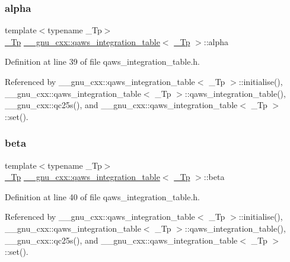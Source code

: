 \subsubsection{\texorpdfstring{alpha}{alpha}}
{\footnotesize\ttfamily template$<$typename \+\_\+\+Tp$>$ \\
\hyperlink{namespace____gnu__cxx_a3b19a9c800ca194374ef9172290f7d79}{\+\_\+\+Tp} \hyperlink{struct____gnu__cxx_1_1qaws__integration__table}{\+\_\+\+\_\+gnu\+\_\+cxx\+::qaws\+\_\+integration\+\_\+table}$<$ \hyperlink{namespace____gnu__cxx_a3b19a9c800ca194374ef9172290f7d79}{\+\_\+\+Tp} $>$\+::alpha}



Definition at line 39 of file qaws\+\_\+integration\+\_\+table.\+h.



Referenced by \+\_\+\+\_\+gnu\+\_\+cxx\+::qaws\+\_\+integration\+\_\+table$<$ \+\_\+\+Tp $>$\+::initialise(), \+\_\+\+\_\+gnu\+\_\+cxx\+::qaws\+\_\+integration\+\_\+table$<$ \+\_\+\+Tp $>$\+::qaws\+\_\+integration\+\_\+table(), \+\_\+\+\_\+gnu\+\_\+cxx\+::qc25s(), and \+\_\+\+\_\+gnu\+\_\+cxx\+::qaws\+\_\+integration\+\_\+table$<$ \+\_\+\+Tp $>$\+::set().

\mbox{\label{struct____gnu__cxx_1_1qaws__integration__table_ad7cdd51af800d8830907d0718035753c}} 
\subsubsection{\texorpdfstring{beta}{beta}}
{\footnotesize\ttfamily template$<$typename \+\_\+\+Tp$>$ \\
\hyperlink{namespace____gnu__cxx_a3b19a9c800ca194374ef9172290f7d79}{\+\_\+\+Tp} \hyperlink{struct____gnu__cxx_1_1qaws__integration__table}{\+\_\+\+\_\+gnu\+\_\+cxx\+::qaws\+\_\+integration\+\_\+table}$<$ \hyperlink{namespace____gnu__cxx_a3b19a9c800ca194374ef9172290f7d79}{\+\_\+\+Tp} $>$\+::beta}



Definition at line 40 of file qaws\+\_\+integration\+\_\+table.\+h.



Referenced by \+\_\+\+\_\+gnu\+\_\+cxx\+::qaws\+\_\+integration\+\_\+table$<$ \+\_\+\+Tp $>$\+::initialise(), \+\_\+\+\_\+gnu\+\_\+cxx\+::qaws\+\_\+integration\+\_\+table$<$ \+\_\+\+Tp $>$\+::qaws\+\_\+integration\+\_\+table(), \+\_\+\+\_\+gnu\+\_\+cxx\+::qc25s(), and \+\_\+\+\_\+gnu\+\_\+cxx\+::qaws\+\_\+integration\+\_\+table$<$ \+\_\+\+Tp $>$\+::set().

